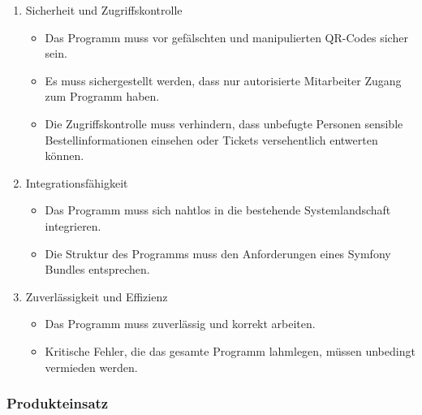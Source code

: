 \begin{enumerate}[itemsep=0em,partopsep=0em,parsep=0em,topsep=0em]
\begin{enumerate}
        \item Sicherheit und Zugriffskontrolle
        \begin{itemize}
            \item Das Programm muss vor gefälschten und manipulierten QR-Codes sicher sein.
            \item Es muss sichergestellt werden, dass nur autorisierte Mitarbeiter Zugang zum Programm haben.
            \item Die Zugriffskontrolle muss verhindern, dass unbefugte Personen sensible Bestellinformationen einsehen oder Tickets versehentlich entwerten können.
        \end{itemize}

        \item Integrationsfähigkeit
        \begin{itemize}
            \item Das Programm muss sich nahtlos in die bestehende Systemlandschaft integrieren.
            \item Die Struktur des Programms muss den Anforderungen eines Symfony Bundles entsprechen.
        \end{itemize}

        \item Zuverlässigkeit und Effizienz
        \begin{itemize}
            \item Das Programm muss zuverlässig und korrekt arbeiten.
            \item Kritische Fehler, die das gesamte Programm lahmlegen, müssen unbedingt vermieden werden.
        \end{itemize}
    \end{enumerate}
\end{enumerate}

\subsubsection*{Produkteinsatz}

